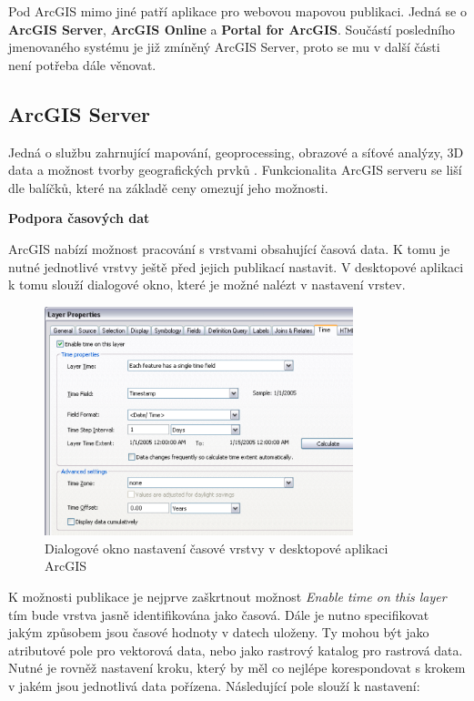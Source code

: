 Pod ArcGIS mimo jiné patří aplikace pro webovou mapovou
publikaci. Jedná se o \textbf{ArcGIS Server}, \textbf{ArcGIS Online} a
\textbf{Portal for ArcGIS}. Součástí posledního jmenovaného systému je
již zmíněný ArcGIS Server, proto se mu v další části není potřeba dále
věnovat.

\newpage
\subsection{ArcGIS Server}

Jedná o službu zahrnující mapování, geoprocessing, obrazové a síťové
analýzy, 3D data a možnost tvorby geografických prvků
\cite{arcgis-publishing-service}. Funkcionalita ArcGIS serveru se liší
dle balíčků, které na základě ceny omezují jeho možnosti.

\bigskip
\noindent \textbf{Podpora časových dat}
 
ArcGIS nabízí možnost pracování s vrstvami obsahující časová data. K
tomu je nutné jednotlivé vrstvy ještě před jejich publikací
nastavit. V desktopové aplikaci k tomu slouží dialogové okno, které je
možné nalézt v nastavení vrstev.

\begin{figure}[h!]  \centering
\includegraphics[width=0.8\textwidth]{../img/arcgis-layer-edit.png}
	\caption{Dialogové okno nastavení časové vrstvy v desktopové
aplikaci ArcGIS}
	\label{fig:arcgis-time-settings}
\end{figure}

K možnosti publikace je nejprve zaškrtnout možnost \textit{Enable time
on this layer} tím bude vrstva jasně identifikována jako časová. Dále
je nutno specifikovat jakým způsobem jsou časové hodnoty v datech
uloženy. Ty mohou být jako atributové pole pro vektorová data, nebo
jako rastrový katalog pro rastrová data. Nutné je rovněž nastavení
kroku, který by měl co nejlépe korespondovat s krokem v jakém jsou
jednotlivá data pořízena. Následující pole slouží k nastavení:

